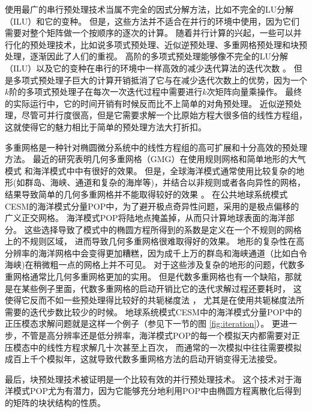 使用最广的串行预处理技术当属不完全的因式分解方法，比如不完全的LU分解（ILU）和它的变种\cite{benzi2002preconditioning}。 
但是，这些方法并不适合在并行的环境中使用，因为它们需要对整个矩阵做一个按顺序的逐次的计算。 
随着并行计算的兴起，一些可以并行化的预处理技术，比如说多项式预处理、近似逆预处理、多重网格预处理和块预处理，逐渐因此了人们的重视。 
高阶的多项式预处理能够像不完全的LU分解（ILU）以及它的变种在串行的环境中一样高效的减少迭代算法的迭代次数\cite{benzi2002preconditioning} 。 
但是多项式预处理子巨大的计算开销抵消了它与在减少迭代次数上的优势，因为一个$k$阶的多项式预处理子在每次一次迭代过程中需要进行$k$次矩阵向量乘操作。 
最终的实际运行中，它的时间开销有时候反而比不上简单的对角预处理\cite{meyer1989numerical,smith1992parallel}。
近似逆预处理，尽管可并行度很高，但是它需要求解一个比原始方程大很多倍的线性方程组\cite{smith1992parallel,bergamaschi2007numerical}， 这就使得它的魅力相比于简单的预处理方法大打折扣。

 
 
多重网格是一种针对椭圆微分系统中的线性方程组的高可扩展和十分高效的预处理方法。 
最近的研究表明几何多重网格（GMG）在使用规则网格和简单地形的大气模式
 \cite{muller2014massively}
 和海洋模式中\cite{matsumura2008non,kanarska2007algorithm}中有很好的效果。 
 但是，全球海洋模式通常使用比较复杂的地形(如群岛、海峡、通道和复杂的海岸等)，并结合以非规则或者各向异性的网格， 结果导致简单的几何多重网格并不能取得较好的效果
\cite{matsumura2008non,fulton1986multigrid,tseng2003ghost,stuben2001review}。 
在公共地球系统模式CESM的海洋模式分量POP中，为了避开极点奇异性问题，采用的是极点偏移的广义正交网格。 
海洋模式POP将陆地点掩盖掉，从而只计算地球表面的海洋部分。
这些选择导致了模式中的椭圆方程所得到的系数是定义在一个不规则的网格上的不规则区域， 进而导致几何多重网格很难取得好的效果。 
地形的复杂性在高分辨率的海洋网格中会变得更加糟糕，因为成千上万的群岛和海峡通道（比如白令海峡)在稍微粗一点的网格上并不可见。
对于这些涉及复杂的地形的问题，代数多重网格通常比几何多重网格更加的实用。 
但是代数多重网格也有一个缺陷，那就是在某些例子里面，代数多重网格的启动开销比它的迭代求解过程还要耗时，
这使得它反而不如一些预处理得比较好的共轭梯度法
\cite{muller2014massively}， 尤其是在使用共轭梯度法所需要的迭代步数比较少的时候。 
地球系统模式CESM中的海洋模式分量POP中的正压模态求解问题就是这样一个例子（参见下一节的图
 \ref{fig:iteration}）。
更进一步，不管是高分辨率还是低分辨率，海洋模式POP的每一个模拟天内都需要对正压模态中的线性方程求解几十次甚至上百次，
而通常的一次模拟中往往需要模拟成百上千个模拟年，这就导致代数多重网格方法的启动开销变得无法接受。


最后，块预处理技术被证明是一个比较有效的并行预处理技术\cite{concus1985block, white2011block}。
这个技术对于海洋模式POP尤为有潜力，因为它能够充分地利用POP中由椭圆方程离散化后得到的矩阵的块状结构的性质。 

